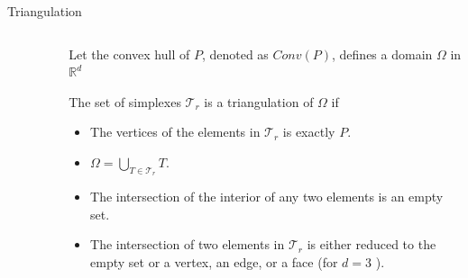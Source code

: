 \documentclass[10pt]{beamer}
\begin{document}
\begin{frame}{Triangulation}
\begin{columns}
	\begin{column}{0.3\textwidth} 
		\begin{figure}[h]
		\end{figure}
	\end{column}
	\begin{column}{0.7\textwidth} 
		Let the convex hull of $P$, denoted as \alert{$Conv(P)$}, defines a domain $\Omega$ in $\mathbb{R}^d$ 
		\bigskip
		
		The set of simplexes $\mathcal{T}_r$ is \alert{a triangulation} of $\Omega$ if
		\begin{itemize}
			\item The vertices of the elements in $ \mathcal{T}_r$ is exactly $P$.
			\item $ \Omega = \bigcup_{T \in \mathcal{T}_r}  T $.
			\item The intersection of the interior of any two elements is an empty set.
			\item The intersection of two elements in  $\mathcal{T}_r$ is either reduced to
				  the empty set or a vertex, an edge, or a face (for $d=3$ ).
		\end{itemize}
	\end{column}
\end{columns}
\end{frame}
\end{document}
